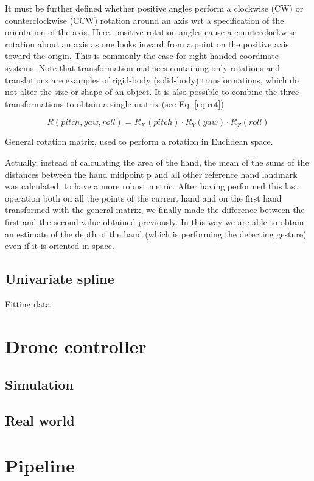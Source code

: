 \noindent It must be further deﬁned whether positive angles perform a clockwise (CW) or counterclockwise (CCW) rotation around an axis \gls{wrt} a speciﬁcation of the orientation of the axis. Here, positive rotation angles cause a counterclockwise rotation about an axis as one looks inward from a point on the positive axis toward the origin. This is commonly the case for right-handed coordinate systems. Note that transformation matrices containing only rotations and translations are examples of rigid-body (solid-body) transformations, which do not alter the size or shape of an object. It is also possible to combine the three transformations to obtain a single matrix (see Eq. \ref{eq:rot})

\begin{Equation}[H]
	\centering
	\begin{equation} \label{eq:rot}
		R(pitch, yaw, roll) = R_X(pitch) \cdot R_Y(yaw) \cdot R_Z(roll)
	\end{equation}
	\caption[General Rotation.]{General rotation matrix, used to perform a rotation in Euclidean space.}
\end{Equation}

\noindent Actually, instead of calculating the area of the hand, the mean of the sums of the distances between the hand midpoint p and all other reference hand landmark was calculated, to have a more robust metric. After having performed this last operation both on all the points of the current hand and on the first hand transformed with the general matrix, we finally made the difference between the first and the second value obtained previously. In this way we are able to obtain an estimate of the depth of the hand (which is performing the detecting gesture) even if it is oriented in space.

\subsection{Univariate spline}
\label{sec:univspline}
Fitting data

\section{Drone controller}
\label{sec:dronecontrl}

\subsection{Simulation}
\label{sec:simulation}

\subsection{Real world}
\label{sec:simulation}

\section{Pipeline}
\label{sec:pipeline}
